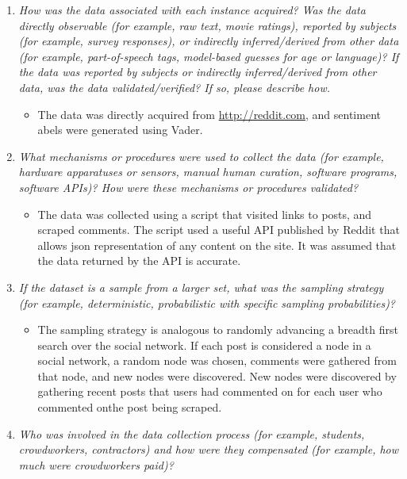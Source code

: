 \documentclass[
]{article}
\providecommand{\tightlist}{%
  \setlength{\itemsep}{0pt}\setlength{\parskip}{0pt}}
\begin{document}
\begin{enumerate}
\def\labelenumi{\arabic{enumi}.}
\tightlist
\item
  \emph{How was the data associated with each instance acquired? Was the data directly observable (for example, raw text, movie ratings), reported by subjects (for example, survey responses), or indirectly inferred/derived from other data (for example, part-of-speech tags, model-based guesses for age or language)? If the data was reported by subjects or indirectly inferred/derived from other data, was the data validated/verified? If so, please describe how.}

  \begin{itemize}
  \tightlist
  \item
    The data was directly acquired from \url{http://reddit.com}, and sentiment abels were generated using Vader.
  \end{itemize}
\item
  \emph{What mechanisms or procedures were used to collect the data (for example, hardware apparatuses or sensors, manual human curation, software programs, software APIs)? How were these mechanisms or procedures validated?}

  \begin{itemize}
  \tightlist
  \item
    The data was collected using a script that visited links to posts, and scraped comments. The script used a useful API published by Reddit that allows json representation of any content on the site. It was assumed that the data returned by the API is accurate.
  \end{itemize}
\item
  \emph{If the dataset is a sample from a larger set, what was the sampling strategy (for example, deterministic, probabilistic with specific sampling probabilities)?}

  \begin{itemize}
  \tightlist
  \item
    The sampling strategy is analogous to randomly advancing a breadth first search over the social network. If each post is considered a node in a social network, a random node was chosen, comments were gathered from that node, and new nodes were discovered. New nodes were discovered by gathering recent posts that users had commented on for each user who commented onthe post being scraped.
  \end{itemize}
\item
  \emph{Who was involved in the data collection process (for example, students, crowdworkers, contractors) and how were they compensated (for example, how much were crowdworkers paid)?}


\end{enumerate}
\end{document}
